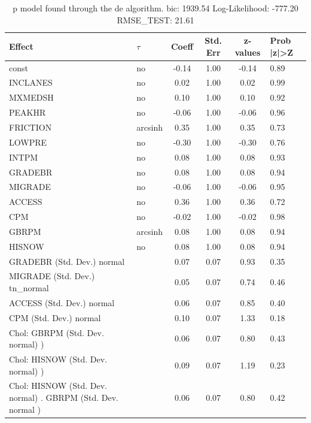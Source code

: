 \begin{table}
	\caption{p model found through the de algorithm. bic: 1939.54 Log-Likelihood: -777.20 RMSE_TEST: 21.61}
	\begin{center}
		\begin{tabular}{|l|l|c|c|c|l|}
			\hline
			Effect & $\tau$ & Coeff & Std. Err & z-values & Prob |z|>Z \\
			\hline
			const & no & -0.14 & 1.00 & -0.14 & 0.89 \\
			\hline
			INCLANES & no & 0.02 & 1.00 & 0.02 & 0.99 \\
			\hline
			MXMEDSH & no & 0.10 & 1.00 & 0.10 & 0.92 \\
			\hline
			PEAKHR & no & -0.06 & 1.00 & -0.06 & 0.96 \\
			\hline
			FRICTION & arcsinh & 0.35 & 1.00 & 0.35 & 0.73 \\
			\hline
			LOWPRE & no & -0.30 & 1.00 & -0.30 & 0.76 \\
			\hline
			INTPM & no & 0.08 & 1.00 & 0.08 & 0.93 \\
			\hline
			GRADEBR & no & 0.08 & 1.00 & 0.08 & 0.94 \\
			\hline
			MIGRADE & no & -0.06 & 1.00 & -0.06 & 0.95 \\
			\hline
			ACCESS & no & 0.36 & 1.00 & 0.36 & 0.72 \\
			\hline
			CPM & no & -0.02 & 1.00 & -0.02 & 0.98 \\
			\hline
			GBRPM & arcsinh & 0.08 & 1.00 & 0.08 & 0.94 \\
			\hline
			HISNOW & no & 0.08 & 1.00 & 0.08 & 0.94 \\
			\hline
			GRADEBR (Std. Dev.) normal &  & 0.07 & 0.07 & 0.93 & 0.35 \\
			\hline
			MIGRADE (Std. Dev.) tn_normal &  & 0.05 & 0.07 & 0.74 & 0.46 \\
			\hline
			ACCESS (Std. Dev.) normal &  & 0.06 & 0.07 & 0.85 & 0.40 \\
			\hline
			CPM (Std. Dev.) normal &  & 0.10 & 0.07 & 1.33 & 0.18 \\
			\hline
			 Chol: GBRPM (Std. Dev. normal) ) &  & 0.06 & 0.07 & 0.80 & 0.43 \\
			\hline
			 Chol: HISNOW (Std. Dev. normal) ) &  & 0.09 & 0.07 & 1.19 & 0.23 \\
			\hline
			 Chol: HISNOW (Std. Dev. normal) . GBRPM (Std. Dev.   normal ) &  & 0.06 & 0.07 & 0.80 & 0.42 \\
			\hline
		\end{tabular}
	\end{center}
\end{table}